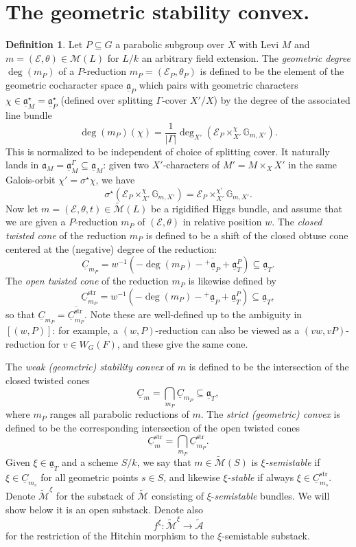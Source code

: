\documentclass[openany]{amsbook}
\theoremstyle{definition}
\newtheorem{definition}[theorem]{Definition}
\theoremstyle{remark}
\numberwithin{equation}{section}
\newcommand{\G}{\mathbb{G}}
\newcommand{\cA}{\mathcal{A}}
\newcommand{\cM}{\mathcal{M}}
\newcommand{\cE}{\mathcal{E}}
\newcommand{\ol}[1]{\overline{#1}}
\newcommand{\ul}[1]{\underline{#1}}
\renewcommand{\-}{\operatorname{-}}
\renewcommand{\a}{\mathfrak{a}}
\newcommand{\str}{\mathrm{str}}
\newcommand{\ctM}{\widetilde{\cM}}
\newcommand{\ctA}{\widetilde{\cA}}
\newcommand{\ga}{\ul{\a}}
\newcommand{\gobtcone}{{}^+ \ul{\a}}
\begin{document}
\section{The geometric stability convex.}




\begin{definition}\label{def.geo.stab.convex}
    Let $P \subseteq G$ a parabolic subgroup over $X$ with Levi $M$ and $m = (\cE, \theta) \in \cM(L)$ for $L/k$ an arbitrary field extension. The \textit{geometric degree} $\deg(m_P)$ of a $P$-reduction $m_P = (\cE_P, \theta_P)$ is defined to be the element of the geometric cocharacter space $\ga_P$ which pairs with geometric characters $\chi \in \ga_M^\star = \ga^\star_P$ (defined over splitting $\Gamma$-cover $X'/X$) by the degree of the associated line bundle
    \[
        \deg(m_P)(\chi) = \frac{1}{|\Gamma|} \deg_{X'}(\cE_P \times^{\chi}_{X'} \G_{m,X'}).
    \]
    This is normalized to be independent of choice of splitting cover. It naturally lands in $\a_M = \ga_M^\Gamma \subseteq \ga_M$: given two $X'$-characters of $M' = M \times_X X'$ in the same Galois-orbit $\chi' = \sigma^\star \chi$, we have
    $$
        \sigma^\star(\cE_P \times_{X'}^{\chi} \G_{m,X'}) = \cE_P \times_{X'}^{\chi'} \G_{m,X'}.
    $$
    Now let $m = (\cE, \theta, t) \in \ctM(L)$ be a rigidified Higgs bundle, and assume that we are given a $P$-reduction $m_P$ of $(\cE, \theta)$ in relative position $w$. 
    The \textit{closed twisted cone} of the reduction $m_P$ is defined to be a shift of the closed obtuse cone centered at the (negative) degree of the reduction:
    \[
    \ul{C}_{m_P} = w^{-1}\left(- \deg(m_P) - \ol{\gobtcone_P} + \ga_T^P\right) \subseteq \ga_T.
    \]
    The \textit{open twisted cone} of the reduction $m_P$ is likewise defined by
    \[
        \ul{C}_{m_P}^{\str} = w^{-1}\left(- \deg(m_P) - \gobtcone_P + \ga_T^P\right) \subseteq \ga_T,
    \]
    so that $\ul{C}_{m_P} = \ol{\ul{C}_{m_P}^{\str}}$. Note these are well-defined up to the ambiguity in $[(w,P)]$: for example, a $(w,P)$-reduction can also be viewed as a $(vw, vP)$-reduction for $v \in W_G(F)$, and these give the same cone.

    The \textit{weak (geometric) stability convex} of $m$ is defined to be the intersection of the closed twisted cones
    \[
        \ul{C}_{m} = \bigcap_{m_P} \ul{C}_{m_P} \subseteq \ga_T,
    \]
    where $m_P$ ranges all parabolic reductions of $m$. The \textit{strict (geometric) convex} is defined to be the corresponding intersection of the open twisted cones 
    $$
        \ul{C}_m^{\str} = \bigcap_{m_P} \ul{C}_{m_P}^{\str}.
    $$ 
    Given $\xi \in \ga_T$ and a scheme $S/k$, we say that $m \in \ctM(S)$ is \emph{$\xi$-semistable} if $\xi \in \ul{C}_{m_s}$ for all geometric points $s \in S$, and likewise \emph{$\xi$-stable} if always $\xi \in \ul{C}_{m_s}^{\str}$. Denote $\ctM^\xi$ for the substack of $\ctM$ consisting of $\xi$-\textit{semistable} bundles. We will show below it is an open substack. Denote also
    $$
        f^\xi : \ctM^\xi \to \ctA
    $$
    for the restriction of the Hitchin morphism to the $\xi$-semistable substack.
\end{definition}
\end{document}
